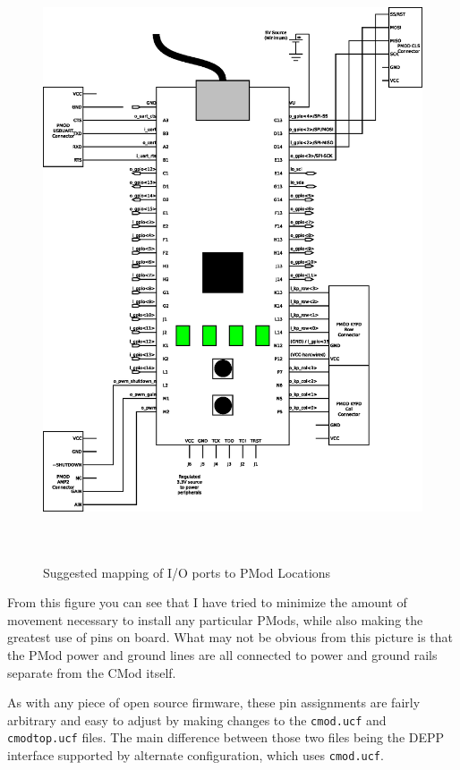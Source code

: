 \documentclass{gqtekspec}
\begin{document}
\begin{figure}
\begin{center}
\includegraphics[height=7in]{../gfx/pmodmap.eps}
\caption{Suggested mapping of I/O ports to PMod Locations}\label{fig:pmodplaces}
\end{center}\end{figure}
From this figure you can see that I have tried to minimize the amount of
movement necessary to install any particular PMods, while also making the
greatest use of pins on board.  What may not be obvious from this picture
is that the PMod power and ground lines are all connected to power and ground
rails separate from the CMod itself.

As with any piece of open source firmware, these pin assignments are fairly
arbitrary and easy to adjust by making changes to the {\tt cmod.ucf} and
{\tt cmodtop.ucf} files.  The main difference between those two files being
the DEPP interface supported by alternate configuration, which uses
{\tt cmod.ucf}.

\end{document}
